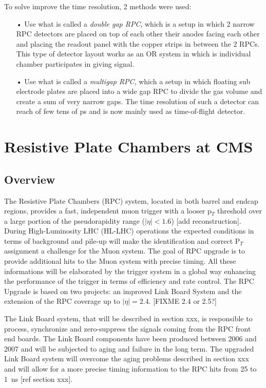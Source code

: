 	To solve improve the time resolution, 2 methods were used:
	
	\begin{itemize}
		\item[•] Use what is called a \textit{double gap RPC}, which is a setup in which 2 narrow RPC detectors are placed on top of each other their anodes facing each other and placing the readout panel with the copper strips in between the 2 RPCs. This type of detector layout works as an OR system in which is individual chamber participates in giving signal.
		\item[•] Use what is called a \textit{multigap RPC}, which a setup in which floating sub electrode plates are placed into a wide gap RPC to divide the gas volume and create a sum of very narrow gaps. The time resolution of such a detector can reach of few tens of \si{ps} and is now mainly used as time-of-flight detector.
	\end{itemize}
	
\section{Resistive Plate Chambers at CMS}
\label{sec:CMS-RPC}

    \subsection{Overview}
    
	The Resistive Plate Chambers (RPC) system, located in both barrel and endcap regions, provides a fast, independent muon trigger with a looser p$_T$ threshold over a large portion of the pseudorapidity range ($|\eta|<1.6$) {\color{blue} [add reconstruction]}.\\
	
	During High-Luminosity LHC (HL-LHC) operations the expected conditions in terms of background and pile-up will make the identification and correct P$_T$ assignment a challenge for the Muon system. The goal of RPC upgrade is to provide additional hits to the Muon system with precise timing. All these informations  will be elaborated by the trigger system  in a global way enhancing the performance of the trigger in terms of efficiency and rate control. The RPC Upgrade is based on two projects: an improved Link Board System and the extension of the RPC coverage up to $|\eta|=2.4$. {\color{blue} [FIXME 2.4 or 2.5?]}

	The Link Board system, that will be described in section xxx, is responsible to process, synchronize and zero-suppress the signals coming from the RPC front end boards. The Link Board components have been produced between 2006 and 2007 and will be subjected to aging and failure in the long term. The upgraded Link Board system will overcome the aging problems described in section xxx and will allow for a more precise timing information to the RPC hits from 25 to \SI{1}{ns} [ref section xxx].


